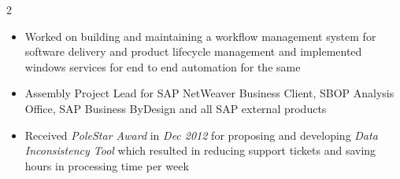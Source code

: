 \documentclass{article}
\begin{document}
\begin{parcolumns}[sloppy=true,sloppyspaces=true,colwidths={1=.3\textwidth,2=.7\textwidth},rulebetween=true]{2}
{\begin{itemize}[noitemsep,nolistsep]
\item Worked on building and maintaining a workflow management system for software delivery and product lifecycle management and implemented windows services for end to end automation for the same
\item Assembly Project Lead for SAP NetWeaver Business Client, SBOP Analysis Office, SAP Business ByDesign and all SAP external products
\item Received \textit{PoleStar Award} in \textit{Dec 2012} for proposing and developing \textit{Data Inconsistency Tool} which resulted in reducing support tickets and saving hours in processing time per week
\end{itemize}
}

\end{parcolumns}
\end{document}
